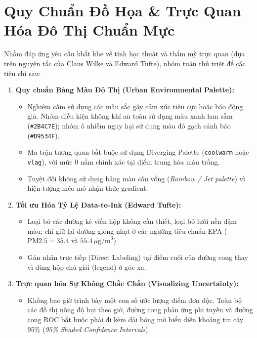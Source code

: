 \documentclass[11pt,a4paper]{article}
\begin{document}
\section{Quy Chuẩn Đồ Họa \& Trực Quan Hóa Đô Thị Chuẩn Mực}

Nhằm đáp ứng yêu cầu khắt khe về tính học thuật và thẩm mỹ trực quan (dựa trên nguyên tắc của Claus Wilke và Edward Tufte), nhóm tuân thủ triệt để các tiêu chí sau:
\begin{enumerate}
    \item \textbf{Quy chuẩn Bảng Màu Đô Thị (Urban Environmental Palette):}
    \begin{itemize}
        \item Nghiêm cấm sử dụng các màu sắc gây cảm xúc tiêu cực hoặc báo động giả. Nhóm điều kiện không khí an toàn sử dụng màu xanh lam sẫm (\texttt{\#2B4C7E}); nhóm ô nhiễm nguy hại sử dụng màu đỏ gạch cảnh báo (\texttt{\#D9534F}).
        \item Ma trận tương quan bắt buộc sử dụng Diverging Palette (\texttt{coolwarm} hoặc \texttt{vlag}), với mức 0 nằm chính xác tại điểm trung hòa màu trắng.
        \item Tuyệt đối không sử dụng bảng màu cầu vồng (\textit{Rainbow / Jet palette}) vì hiện tượng méo mó nhận thức gradient.
    \end{itemize}
    \item \textbf{Tối ưu Hóa Tỷ Lệ Data-to-Ink (Edward Tufte):}
    \begin{itemize}
        \item Loại bỏ các đường kẻ viền hộp không cần thiết, loại bỏ lưới nền đậm màu; chỉ giữ lại đường gióng nhạt ở các ngưỡng tiêu chuẩn EPA ($\text{PM2.5} = 35.4$ và $55.4\,\mu\text{g/m}^3$).
        \item Gán nhãn trực tiếp (Direct Labeling) tại điểm cuối của đường cong thay vì dùng hộp chú giải (legend) ở góc xa.
    \end{itemize}
    \item \textbf{Trực quan hóa Sự Không Chắc Chắn (Visualizing Uncertainty):}
    \begin{itemize}
        \item Không bao giờ trình bày một con số ước lượng điểm đơn độc. Toàn bộ các đồ thị nồng độ bụi theo giờ, đường cong phản ứng phi tuyến và đường cong ROC bắt buộc phải đi kèm dải bóng mờ biểu diễn khoảng tin cậy 95\% (\textit{95\% Shaded Confidence Intervals}).
    \end{itemize}
\end{enumerate}
\end{document}
